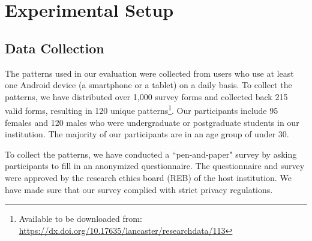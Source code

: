 

\section{Experimental Setup \label{sec:setup}}
    \subsection{Data Collection}
    \label{section:locking patterns}
    The patterns used in our evaluation were collected from users who use at least one Android device (a smartphone or a tablet) on a daily basis.
    To collect the patterns, we have distributed over 1,000 survey forms and collected back 215 valid forms, resulting in 120 unique patterns\footnote{Available to be downloaded from: \url{https://dx.doi.org/10.17635/lancaster/researchdata/113}}.
    Our participants include 95 females and 120 males who were undergraduate or postgraduate students in our institution.
    The majority of our participants are in an age group of under 30.

    To collect the patterns, we have conducted a ``pen-and-paper" survey by asking participants to fill in an anonymized questionnaire.
    The questionnaire and survey were approved by the research ethics board (REB) of the host institution.
    We have made sure that our survey complied with strict privacy regulations.


